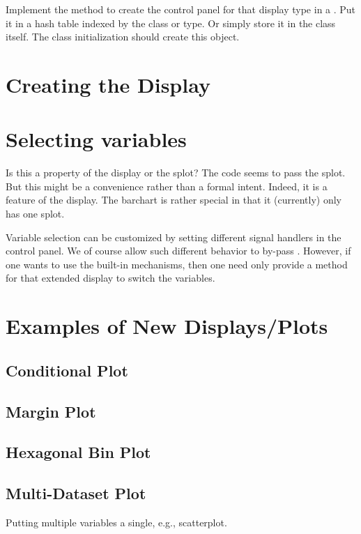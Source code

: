 \documentclass{article}
\begin{document}
Implement the  method to create the control panel
for that display type in a .  Put it in a hash table
indexed by the class or type. Or simply store it in the class itself.
The class initialization should create this object.


\section{Creating the Display}


\section{Selecting variables}

Is this a property of the display or the splot? The code seems to pass
the splot. But this might be a convenience rather than a formal
intent.  Indeed, it is a feature of the display.  The barchart is
rather special in that it (currently) only has one splot.

Variable selection can be customized by setting different signal
handlers in the control panel.  We of course allow such different
behavior to by-pass . However, if one wants to use
the built-in mechanisms, then one need only provide a method for that
extended display to switch the variables.


\section{Examples of New Displays/Plots}
\subsection{Conditional Plot}

\subsection{Margin Plot}

\subsection{Hexagonal Bin Plot}

\subsection{Multi-Dataset Plot}
Putting multiple variables  a single, e.g., scatterplot.
\end{document}
